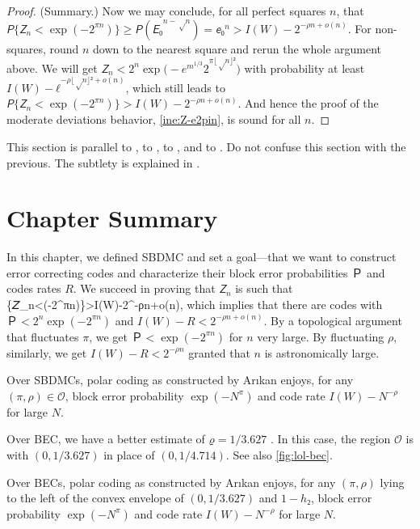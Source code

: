 \documentclass[openany]{amsbook}
\makeatletter
\numberwithin{equation}{chapter}
\numberwithin{figure}{chapter}
\numberwithin{table}{chapter}
\def\bigl@C#1{\bigl#1}					\def\bigr@C#1{\bigr#1}
\def\({\bigl@C(}	\def\){\bigr@C)}	令（{\Bigl(}			令）{\Bigr)}
\def\[#1\]{\begin{equation*}{#1}\end{equation*}}
\theoremstyle{definition}	理dfn:Definition~?s			理exa:Example~?s
\theoremstyle{remark}		理cla:Claim~?s				理rem:Remark~?s
\makeatother
\begin{document}
\begin{proof}
		(Summary.)
		Now we may conclude, for all perfect squares $n$, that
		$𝘗\{𝘡_n<\exp(-2^{πn})\}≥𝘗(𝘌₀^{n-√n})=𝘦₀^n>I(W)-2^{-ρn+o(n)}$.
		For non-squares, round $n$ down to the nearest square
		and rerun the whole argument above.
		We will get $𝘡_n<2^n\exp\(-e^{m^{1/3}}2^{π⌊√n⌋²}\)$
		with probability at least $I(W)-ℓ^{-ρ⌊√n⌋²+o(n)}$,
		which still leads to $𝘗\{𝘡_n<\exp(-2^{πn})\}>I(W)-2^{-ρn+o(n)}$.
		And hence the proof of the moderate deviations behavior,
		\cref{ine:Z-e2pin}, is sound for all $n$.
	\end{proof}
	
	This section is parallel
	to \cite[section~V]{ModerateDeviations18}, to \cite[section~VI]{LargeDeviations18},
	to \cite[appendix~C.D]{Hypotenuse19}, and to \cite[section~10.3]{GRY19}.
	Do not confuse this section with the previous.
	The subtlety is explained in \cite[section~III]{LargeDeviations18}.

\section{Chapter Summary}

	In this chapter, we defined SBDMC and set a goal---that we
	want to construct error correcting codes and characterize
	their block error probabilities $Ｐ$ and codes rates $R$.
	We succeed in proving that $𝘡_n$ is such that
	\[𝘗\{𝘡_n<\exp(-2^{πn})\}>I(W)-2^{-ρn+o(n)},\]
	which implies that there are codes with
	$Ｐ<2^n\exp(-2^{πn})$ and $I(W)-R<2^{-ρn+o(n)}$.
	By a topological argument that fluctuates $π$,
	we get $Ｐ<\exp(-2^{πn})$ for $n$ very large.
	By fluctuating $ρ$, similarly, we get $I(W)-R<2^{-ρn}$
	granted that $n$ is astronomically large.
	
	\begin{cor}
		Over SBDMCs, polar coding as constructed by Arıkan enjoys, for any $(π,ρ)∈𝒪$,
		block error probability $\exp(-N^π)$ and code rate $I(W)-N^{-ρ}$ for large $N$.
	\end{cor}
	
	Over BEC, we have a better estimate of $ϱ=1/3.627$ \cite{HAU14}.
	In this case, the region $𝒪$ is with $(0,1/3.627)$ in place of $(0,1/4.714)$.
	See also \cref{fig:lol-bec}.
	
	\begin{cor}
		Over BECs, polar coding as constructed by Arıkan enjoys, for any $(π,ρ)$
		lying to the left of the convex envelope of $(0,1/3.627)$ and $1-h₂$,
		block error probability $\exp(-N^π)$ and code rate $I(W)-N^{-ρ}$ for large $N$.
	\end{cor}
	
\end{document}
